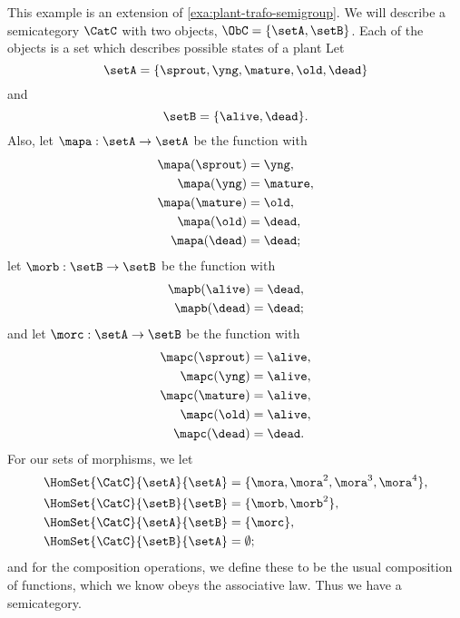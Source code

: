 \begin{example}
    \label{exa:semicat-plant-states}
    This example is an extension of \cref{exa:plant-trafo-semigroup}.
    We will describe a semicategory $\CatC$ with two objects, $\ObC = \{ \setA, \setB \}$.
    Each of the objects is a set which describes possible states of a plant
    Let
    \begin{equation}
        \setA = \{ \sprout, \yng, \mature, \old, \dead \}
    \end{equation}
    and
    \begin{equation}
        \setB = \{ \alive, \dead \}.
    \end{equation}
    Also, let $\mapa : \setA \to \setA$ be the function with
    \begin{align*}
        \mapa(\sprout) & =  \yng,    \\
        \mapa(\yng)    & =  \mature, \\
        \mapa(\mature) & =  \old,    \\
        \mapa( \old)   & = \dead,    \\
        \mapa (\dead)  & = \dead;
    \end{align*}
    let $\morb : \setB \to \setB$ be the function with
    \begin{align*}
        \mapb(\alive) & =  \dead, \\
        \mapb(\dead)  & =  \dead;
    \end{align*}
    and let $\morc : \setA \to \setB$ be the function with
    \begin{align*}
        \mapc(\sprout) & = \alive,  \\
        \mapc(\yng)    & =  \alive, \\
        \mapc(\mature) & = \alive , \\
        \mapc( \old)   & = \alive,  \\
        \mapc (\dead)  & = \dead.
    \end{align*}
    For our sets of morphisms, we let
    \begin{align*}
        \HomSet{\CatC}{\setA}{\setA} & = \{ \mora, \mora^2, \mora^3, \mora^4 \}, \\
        \HomSet{\CatC}{\setB}{\setB} & =  \{ \morb, \morb^2 \},                  \\
        \HomSet{\CatC}{\setA}{\setB} & =  \{ \morc \},                           \\
        \HomSet{\CatC}{\setB}{\setA} & = \emptyset;
    \end{align*}
    and for the composition operations, we define these to be the usual composition of functions, which we know obeys the associative law.
    Thus we have a semicategory.
\end{example}


